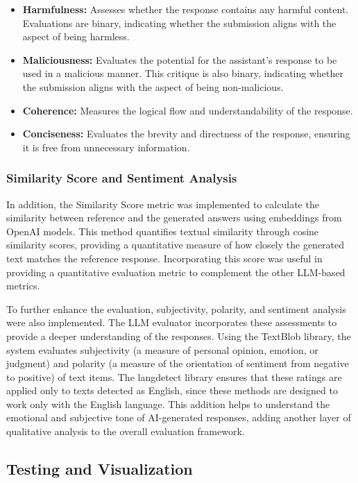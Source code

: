 \begin{itemize}
    \item \textbf{Harmfulness:} Assesses whether the response contains any harmful content. Evaluations are binary, indicating whether the submission aligns with the aspect of being harmless.
    \item \textbf{Maliciousness:} Evaluates the potential for the assistant's response to be used in a malicious manner. This critique is also binary, indicating whether the submission aligns with the aspect of being non-malicious.
    \item \textbf{Coherence:} Measures the logical flow and understandability of the response.
    \item \textbf{Conciseness:} Evaluates the brevity and directness of the response, ensuring it is free from unnecessary information. \cite{es2023ragas}
\end{itemize}

\subsubsection{Similarity Score and Sentiment Analysis}

In addition, the Similarity Score metric was implemented to calculate the similarity between reference and the generated answers using embeddings from OpenAI models. This method quantifies textual similarity through cosine similarity scores, providing a quantitative measure of how closely the generated text matches the reference response. Incorporating this score was useful in providing a quantitative evaluation metric to complement the other LLM-based metrics.

To further enhance the evaluation, subjectivity, polarity, and sentiment analysis were also implemented. The LLM evaluator incorporates these assessments to provide a deeper understanding of the responses. Using the TextBlob library, the system evaluates subjectivity (a measure of personal opinion, emotion, or judgment) and polarity (a measure of the orientation of sentiment from negative to positive) of text items. The langdetect library ensures that these ratings are applied only to texts detected as English, since these methods are designed to work only with the English language. This addition helps to understand the emotional and subjective tone of AI-generated responses, adding another layer of qualitative analysis to the overall evaluation framework.

\subsection{Testing and Visualization}


